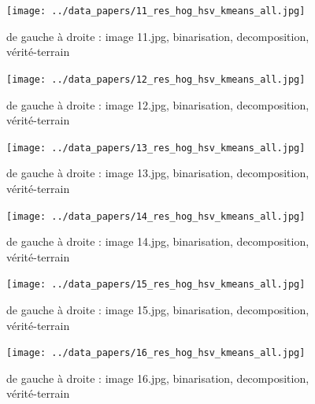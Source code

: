 \documentclass{book}
\begin{document}
\begin{figure}[H]
\begin{center}
\texttt{[image: ../data\_papers/11\_res\_hog\_hsv\_kmeans\_all.jpg]}
\end{center}
\caption{de gauche à droite : image 11.jpg, binarisation, decomposition, vérité-terrain}
\label{11}
\end{figure}
\clearpage


\begin{figure}[H]
\begin{center}
\texttt{[image: ../data\_papers/12\_res\_hog\_hsv\_kmeans\_all.jpg]}
\end{center}
\caption{de gauche à droite : image 12.jpg, binarisation, decomposition, vérité-terrain}
\label{12}
\end{figure}
\clearpage


\begin{figure}[H]
\begin{center}
\texttt{[image: ../data\_papers/13\_res\_hog\_hsv\_kmeans\_all.jpg]}
\end{center}
\caption{de gauche à droite : image 13.jpg, binarisation, decomposition, vérité-terrain}
\label{13}
\end{figure}
\clearpage


\begin{figure}[H]
\begin{center}
\texttt{[image: ../data\_papers/14\_res\_hog\_hsv\_kmeans\_all.jpg]}
\end{center}
\caption{de gauche à droite : image 14.jpg, binarisation, decomposition, vérité-terrain}
\label{14}
\end{figure}
\clearpage


\begin{figure}[H]
\begin{center}
\texttt{[image: ../data\_papers/15\_res\_hog\_hsv\_kmeans\_all.jpg]}
\end{center}
\caption{de gauche à droite : image 15.jpg, binarisation, decomposition, vérité-terrain}
\label{15}
\end{figure}
\clearpage


\begin{figure}[H]
\begin{center}
\texttt{[image: ../data\_papers/16\_res\_hog\_hsv\_kmeans\_all.jpg]}
\end{center}
\caption{de gauche à droite : image 16.jpg, binarisation, decomposition, vérité-terrain}
\label{16}
\end{figure}
\clearpage
\end{document}
